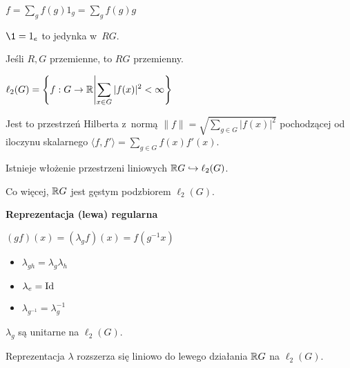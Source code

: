 \begin{uwaga}[konwencja]
	$f = \sum_g f(g) 1_g = \sum_g f(g) g$
\end{uwaga}

\begin{fakt}
	$\1 = 1_e$ to jedynka w~$RG$.
\end{fakt}

\begin{fakt}
	Jeśli $R, G$ przemienne, to $RG$ przemienny.
\end{fakt}

\begin{definicja}
	$\displaystyle \ell_2(G) = \left\{ f: G \to {\mathbb{R}} \middle| \sum_{x \in G} |f(x)|^2 < \infty \right\}$
	
	Jest to przestrzeń Hilberta z~normą 
	$\| f\| = \sqrt{ \sum_{g \in G} |f(x)|^2 }$
	pochodzącej od iloczynu skalarnego
	$\langle f, f' \rangle = \sum_{g \in G} f(x) f'(x)$.
\end{definicja}

\begin{fakt}
	Istnieje włożenie przestrzeni liniowych 
	${\mathbb{R}} G \hookrightarrow \ell_2(G)$.
	
	Co więcej, ${\mathbb{R}} G$ jest gęstym podzbiorem $\ell_2(G)$.
\end{fakt}

{\bf Reprezentacja (lewa) regularna}

\begin{definicja}
	$(g f)(x) = (\lambda_g f) (x) = f(g^{-1} x)$
\end{definicja}

\begin{fakt}
	\begin{itemize}
		\item $\lambda_{gh} = \lambda_g \lambda_h$
		\item $\lambda_e = {\mathrm{Id}}$
		\item $\lambda_{g^{-1}} = \lambda_g^{-1}$
	\end{itemize}

\end{fakt}

\begin{lemat}
	$\lambda_g$ są unitarne na $\ell_2(G)$.
\end{lemat}

\begin{fakt}
	Reprezentacja $\lambda$ rozszerza się liniowo do
	lewego działania ${\mathbb{R}} G$ na $\ell_2(G)$.
\end{fakt}

